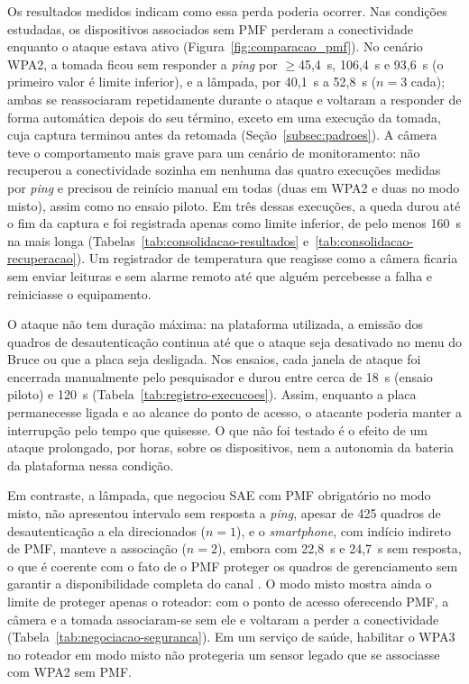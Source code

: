 Os resultados medidos indicam como essa perda poderia ocorrer. Nas condições estudadas, os dispositivos associados sem PMF perderam a conectividade enquanto o ataque estava ativo (Figura~\ref{fig:comparacao_pmf}). No cenário WPA2, a tomada ficou sem responder a \textit{ping} por $\geq$45,4~s, 106,4~s e 93,6~s (o primeiro valor é limite inferior), e a lâmpada, por 40,1~s a 52,8~s ($n=3$ cada); ambas se reassociaram repetidamente durante o ataque e voltaram a responder de forma automática depois do seu término, exceto em uma execução da tomada, cuja captura terminou antes da retomada (Seção~\ref{subsec:padroes}). A câmera teve o comportamento mais grave para um cenário de monitoramento: não recuperou a conectividade sozinha em nenhuma das quatro execuções medidas por \textit{ping} e precisou de reinício manual em todas (duas em WPA2 e duas no modo misto), assim como no ensaio piloto. Em três dessas execuções, a queda durou até o fim da captura e foi registrada apenas como limite inferior, de pelo menos 160~s na mais longa (Tabelas~\ref{tab:consolidacao-resultados} e~\ref{tab:consolidacao-recuperacao}). Um registrador de temperatura que reagisse como a câmera ficaria sem enviar leituras e sem alarme remoto até que alguém percebesse a falha e reiniciasse o equipamento.

O ataque não tem duração máxima: na plataforma utilizada, a emissão dos quadros de desautenticação continua até que o ataque seja desativado no menu do Bruce ou que a placa seja desligada. Nos ensaios, cada janela de ataque foi encerrada manualmente pelo pesquisador e durou entre cerca de 18~s (ensaio piloto) e 120~s (Tabela~\ref{tab:registro-execucoes}). Assim, enquanto a placa permanecesse ligada e ao alcance do ponto de acesso, o atacante poderia manter a interrupção pelo tempo que quisesse. O que não foi testado é o efeito de um ataque prolongado, por horas, sobre os dispositivos, nem a autonomia da bateria da plataforma nessa condição.

Em contraste, a lâmpada, que negociou SAE com PMF obrigatório no modo misto, não apresentou intervalo sem resposta a \textit{ping}, apesar de 425 quadros de desautenticação a ela direcionados ($n=1$), e o \textit{smartphone}, com indício indireto de PMF, manteve a associação ($n=2$), embora com 22,8~s e 24,7~s sem resposta, o que é coerente com o fato de o PMF proteger os quadros de gerenciamento sem garantir a disponibilidade completa do canal \cite{CiscoMFP2024}. O modo misto mostra ainda o limite de proteger apenas o roteador: com o ponto de acesso oferecendo PMF, a câmera e a tomada associaram-se sem ele e voltaram a perder a conectividade (Tabela~\ref{tab:negociacao-seguranca}). Em um serviço de saúde, habilitar o WPA3 no roteador em modo misto não protegeria um sensor legado que se associasse com WPA2 sem PMF.

